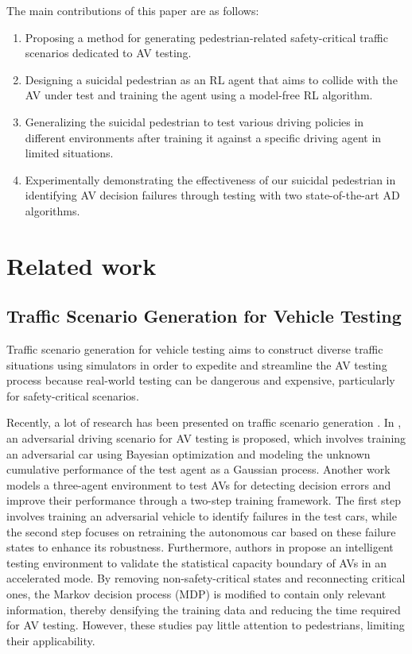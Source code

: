 \documentclass[letterpaper, 10 pt, conference]{ieeeconf}
\begin{document}
The main contributions of this paper are as follows:
\begin{enumerate}
\item {Proposing a method for generating pedestrian-related safety-critical traffic scenarios dedicated to AV testing.} 
\item {Designing a suicidal pedestrian as an RL agent that aims to collide with the AV under test and training the agent using a model-free RL algorithm.}
\item {Generalizing %
the suicidal pedestrian to test various driving policies in different environments after training it against a specific driving agent in limited situations.}
\item {Experimentally demonstrating the effectiveness of our suicidal pedestrian in identifying AV decision failures through testing with two state-of-the-art AD algorithms.}
\end{enumerate}







\section{Related work} 


\subsection{Traffic Scenario Generation for Vehicle Testing}

Traffic scenario generation for vehicle testing aims to construct diverse traffic situations using simulators in order to expedite and streamline the AV testing process because real-world testing can be dangerous and expensive, particularly for safety-critical scenarios.

Recently, a lot of research has been presented on traffic scenario generation \cite{traffic_scenario_1, traffic_scenario_2, traffic_scenario_3, traffic_scenario_deeproad}. In \cite{traffic_scenario_2}, an adversarial driving scenario for AV testing is proposed, which involves training an adversarial car using Bayesian optimization and modeling the unknown cumulative performance of the test agent as a Gaussian process. Another work \cite{traffic_scenario_1} models a three-agent environment to test AVs for detecting decision errors and improve their performance through a two-step training framework. The first step involves training an adversarial vehicle to identify failures in the test cars, while the second step focuses on retraining the autonomous car based on these failure states to enhance its robustness. Furthermore, authors in \cite{traffic_scenario_3} propose an intelligent testing environment to validate the statistical capacity boundary of AVs in an accelerated mode. By removing non-safety-critical states and reconnecting critical ones, the Markov decision process (MDP) is modified to contain only relevant information, thereby densifying the training data and reducing the time required for AV testing. However, these studies pay little attention to pedestrians, limiting their applicability.
\end{document}

